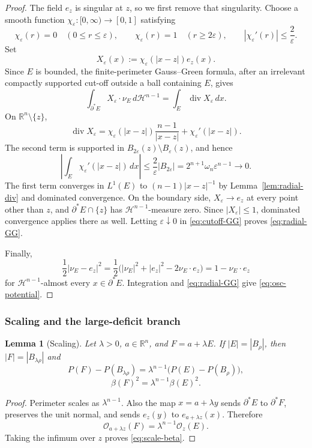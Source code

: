\documentclass[11pt]{amsart}
\newtheorem{lemma}[theorem]{Lemma}
\theoremstyle{definition}
\newcommand{\R}{\mathbb R}
\newcommand{\eps}{\varepsilon}
\newcommand{\Hn}{\mathcal H^{n-1}}
\newcommand{\Per}{P}
\newcommand{\osc}{\mathcal O}
\begin{document}
\begin{proof}
The field \(e_z\) is singular at \(z\), so we first remove that singularity.
Choose a smooth function \(\chi_\eps:[0,\infty)\to[0,1]\) satisfying
\[
   \chi_\eps(r)=0\quad (0\le r\le\eps),\qquad
   \chi_\eps(r)=1\quad (r\ge2\eps),\qquad
   |\chi_\eps'(r)|\le\frac{2}{\eps}.
\]
Set
\[
   X_\eps(x):=\chi_\eps(|x-z|)e_z(x).
\]
Since \(E\) is bounded, the finite-perimeter Gauss--Green formula, after an
irrelevant compactly supported cut-off outside a ball containing \(E\), gives
\[
   \int_{\partial^*E}X_\eps\cdot\nu_E\,d\Hn
   =\int_E\operatorname{div}X_\eps\,dx.
\tag{2.4}\label{eq:cutoff-GG}
\]
On \(\R^n\setminus\{z\}\),
\[
   \operatorname{div}X_\eps
   =\chi_\eps(|x-z|)\frac{n-1}{|x-z|}
     +\chi_\eps'(|x-z|).
\]
The second term is supported in
\(B_{2\eps}(z)\setminus B_\eps(z)\), and hence
\[
   \left|\int_E\chi_\eps'(|x-z|)\,dx\right|
   \le \frac2\eps |B_{2\eps}|
   =2^{n+1}\omega_n\eps^{n-1}\longrightarrow0.
\]
The first term converges in \(L^1(E)\) to
\((n-1)|x-z|^{-1}\) by Lemma~\ref{lem:radial-div} and dominated convergence.
On the boundary side, \(X_\eps\to e_z\) at every point other than \(z\), and
\(\partial^*E\cap\{z\}\) has \(\Hn\)-measure zero.  Since
\(|X_\eps|\le1\), dominated convergence applies there as well.  Letting
\(\eps\downarrow0\) in \eqref{eq:cutoff-GG} proves
\eqref{eq:radial-GG}.

Finally,
\[
   \frac12|\nu_E-e_z|^2
   =\frac12\bigl(|\nu_E|^2+|e_z|^2-2\nu_E\cdot e_z\bigr)
   =1-\nu_E\cdot e_z
\]
for \(\Hn\)-almost every \(x\in\partial^*E\).  Integration and
\eqref{eq:radial-GG} give \eqref{eq:osc-potential}.
\end{proof}

\subsubsection{Scaling and the large-deficit branch}

\begin{lemma}[Scaling]\label{lem:scaling}
Let \(\lambda>0\), \(a\in\R^n\), and \(F=a+\lambda E\).  If
\(|E|=|B_\rho|\), then \(|F|=|B_{\lambda\rho}|\) and
\[
   \Per(F)-\Per(B_{\lambda\rho})
      =\lambda^{n-1}\bigl(\Per(E)-\Per(B_\rho)\bigr),
\tag{2.5}\label{eq:scale-D}
\]
\[
   \beta(F)^2=\lambda^{n-1}\beta(E)^2.
\tag{2.6}\label{eq:scale-beta}
\]
\end{lemma}

\begin{proof}
Perimeter scales as \(\lambda^{n-1}\).  Also the map
\(x=a+\lambda y\) sends \(\partial^*E\) to \(\partial^*F\), preserves the
unit normal, and sends \(e_z(y)\) to \(e_{a+\lambda z}(x)\).  Therefore
\[
   \osc_{a+\lambda z}(F)=\lambda^{n-1}\osc_z(E).
\]
Taking the infimum over \(z\) proves \eqref{eq:scale-beta}.
\end{proof}
\end{document}
